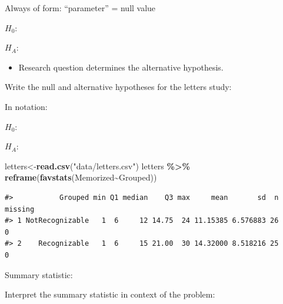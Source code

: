 \documentclass[
]{report}
\newenvironment{Shaded}{\begin{snugshade}}{\end{snugshade}}
\newcommand{\FunctionTok}[1]{\textcolor[rgb]{0.13,0.29,0.53}{\textbf{#1}}}
\newcommand{\NormalTok}[1]{#1}
\newcommand{\OtherTok}[1]{\textcolor[rgb]{0.56,0.35,0.01}{#1}}
\newcommand{\SpecialCharTok}[1]{\textcolor[rgb]{0.81,0.36,0.00}{\textbf{#1}}}
\newcommand{\StringTok}[1]{\textcolor[rgb]{0.31,0.60,0.02}{#1}}
\providecommand{\tightlist}{%
  \setlength{\itemsep}{0pt}\setlength{\parskip}{0pt}}
\newcommand{\rgi}{\hspace{24pt}}  %
\begin{document}
\rgi Always of form: ``parameter'' = null value

\(H_0:\)

\vspace{0.5in}

\(H_A:\)

\vspace{0.5in}

\begin{itemize}
\tightlist
\item
  Research question determines the alternative hypothesis.
\end{itemize}

Write the null and alternative hypotheses for the letters study:

In notation:

\(H_0:\)

\vspace{0.2in}

\(H_A:\)

\vspace{0.2in}

\begin{Shaded}
\begin{Highlighting}[]
\NormalTok{letters}\OtherTok{\textless{}{-}}\FunctionTok{read.csv}\NormalTok{(}\StringTok{"data/letters.csv"}\NormalTok{)}
\NormalTok{letters }\SpecialCharTok{\%\textgreater{}\%}
    \FunctionTok{reframe}\NormalTok{(}\FunctionTok{favstats}\NormalTok{(Memorized}\SpecialCharTok{\textasciitilde{}}\NormalTok{Grouped))}
\end{Highlighting}
\end{Shaded}

\begin{verbatim}
#>           Grouped min Q1 median    Q3 max     mean       sd  n missing
#> 1 NotRecognizable   1  6     12 14.75  24 11.15385 6.576883 26       0
#> 2    Recognizable   1  6     15 21.00  30 14.32000 8.518216 25       0
\end{verbatim}

Summary statistic:

\vspace{0.4in}

Interpret the summary statistic in context of the problem:

\vspace{0.4in}
\end{document}
